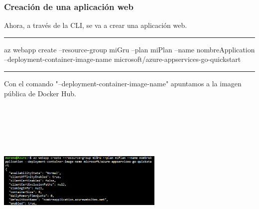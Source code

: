 \documentclass[english,runningheads,a4paper]{llncs}[2018/03/10]
\newenvironment{nscenter}
 {\parskip=0pt\par\nopagebreak\centering}
 {\par\noindent\ignorespacesafterend}
\begin{document}
\subsubsection*{Creación de una aplicación web}
Ahora, a través de la CLI, se va a crear una aplicación web.
\newline
\begin{nscenter}
\noindent\rule{10cm}{0.4pt}

az webapp create --resource-group miGru --plan miPlan --name nombreApplication 
--deployment-container-image-name microsoft/azure-appservices-go-quickstart

\noindent\rule{10cm}{0.4pt}
\end{nscenter}
\newline
Con el comando "--deployment-container-image-name" apuntamos a la imagen pública
de Docker Hub. \\
\begin{nscenter}
\includegraphics[width=8cm,height=8cm,keepaspectratio]{./Contenedores/Azure/4.png}
\end{nscenter}
\end{document}
